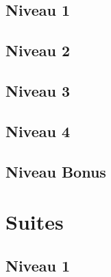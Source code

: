 \documentclass[a4paper]{report}
\begin{document}
			\subsection{Niveau 1}
		
			\subsection{Niveau 2}
		
			\subsection{Niveau 3}
			
			\subsection{Niveau 4}
			
			\subsection{Niveau Bonus}
		
		\section{Suites}
		
			\subsection{Niveau 1}
			
\end{document}
